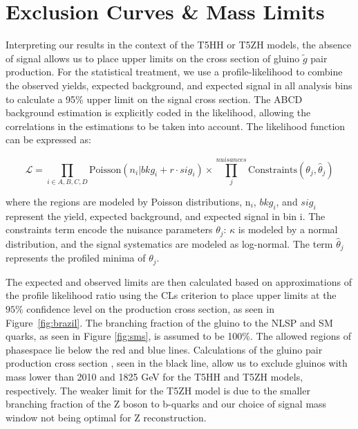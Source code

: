 \section{Exclusion Curves \& Mass Limits}

Interpreting our results in the context of the T5HH or T5ZH models, the absence of signal allows us to place upper limits on the cross section of gluino $\tilde{g}$ pair production. For the statistical treatment, we use a profile-likelihood to combine the observed yields, expected background, and expected signal in all analysis bins to calculate a 95\% upper limit on the signal cross section. The ABCD background estimation is explicitly coded in the likelihood, allowing the correlations in the estimations to be taken into account. The likelihood function can be expressed as:

\begin{equation}
\mathcal{L}=\prod_{i \in A, B, C, D}\mathrm{Poisson}\left(n_i \vert bkg_i + r\cdot sig_i\right) \times \prod^{nuisances}_j \mathrm{Constraints}\left(\theta_j , \hat{\theta}_j\right)
\end{equation}

where the regions are modeled by Poisson distributions, n$_{i}$, $bkg_{i}$, and $sig_{i}$ represent the yield, expected background, and  expected signal in bin i. The constraints term encode the nuisance parameters $\theta_{j}$: $\kappa$ is modeled by a normal distribution, and the signal systematics are modeled as log-normal. The term $\hat{\theta}_{j}$ represents the profiled minima of $\theta_{j}$. 

The expected and observed limits are then calculated based on approximations of the profile likelihood ratio using the CLs criterion to place upper limits at the $95\%$ confidence level on the production cross section, as seen in Figure~\ref{fig:brazil}. The branching fraction of the gluino to the NLSP and SM quarks, as seen in Figure \ref{fig:sms}, is assumed to be 100\%. The allowed regions of phasespace lie below the red and blue lines. Calculations of the gluino pair production cross section \cite{ggcs}, seen in the black line, allow us to exclude gluinos with mass lower than 2010 and 1825 GeV for the T5HH and T5ZH models, respectively. The weaker limit for the T5ZH model is due to the smaller branching fraction of the Z boson to b-quarks and our choice of signal mass window not being optimal for Z reconstruction.

